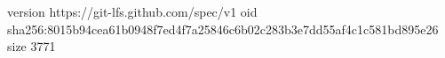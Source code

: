 version https://git-lfs.github.com/spec/v1
oid sha256:8015b94cea61b0948f7ed4f7a25846c6b02c283b3e7dd55af4c1c581bd895e26
size 3771
